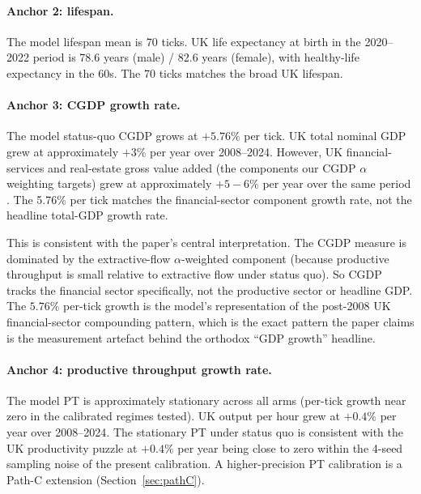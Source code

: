 \documentclass[11pt]{article}
\begin{document}
\paragraph{Anchor 2: lifespan.}  The model lifespan mean is 70 ticks.
UK life expectancy at birth in the 2020--2022 period is 78.6 years
(male) / 82.6 years (female), with healthy-life expectancy in the
60s.  The 70 ticks matches the broad UK lifespan.

\paragraph{Anchor 3: CGDP growth rate.}  The model status-quo CGDP
grows at $+5.76\%$ per tick.  UK total nominal GDP grew at approximately
$+3\%$ per year over 2008--2024.  However, UK financial-services and
real-estate gross value added (the components our CGDP $\alpha$
weighting targets) grew at approximately $+5{-}6\%$ per year over the
same period \citep{ons2024productivity}.  The 5.76\% per tick
matches the financial-sector component growth rate, not the
headline total-GDP growth rate.

This is consistent with the paper's central interpretation.  The
CGDP measure is dominated by the extractive-flow $\alpha$-weighted
component (because productive throughput is small relative to
extractive flow under status quo).  So CGDP tracks the financial
sector specifically, not the productive sector or headline GDP.
The $5.76\%$ per-tick growth is the model's representation of the
post-2008 UK financial-sector compounding pattern, which is the
exact pattern the paper claims is the measurement artefact behind
the orthodox ``GDP growth'' headline.

\paragraph{Anchor 4: productive throughput growth rate.}  The model
PT is approximately stationary across all arms (per-tick growth
near zero in the calibrated regimes tested).  UK output per hour
grew at $+0.4\%$ per year over 2008--2024.  The stationary PT under
status quo is consistent with the UK productivity puzzle at $+0.4\%$
per year being close to zero within the 4-seed sampling noise of the
present calibration.  A higher-precision PT calibration is a Path-C
extension (Section~\ref{sec:pathC}).
\end{document}
